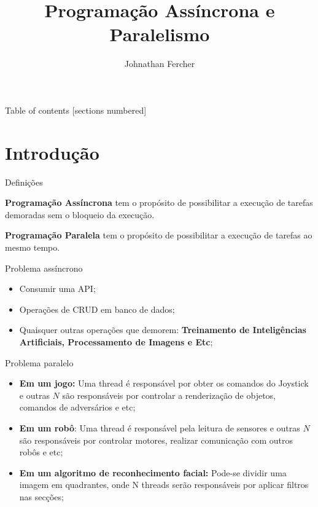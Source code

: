 \documentclass[10pt]{beamer}
\title{Programação Assíncrona e Paralelismo}
\author{Johnathan Fercher}
\begin{document}
\maketitle

\begin{frame}{Table of contents}
  [sections numbered]
  \tableofcontents[hideallsubsections]
\end{frame}

\section{Introdução}

\begin{frame}[fragile]{Definições}

  \textbf{Programação Assíncrona} tem o propósito de possibilitar a execução de tarefas demoradas sem o bloqueio da execução.

  \textbf{Programação Paralela} tem o propósito de possibilitar a execução de tarefas ao mesmo tempo.
  
\end{frame}
\begin{frame}[fragile]{Problema assíncrono}
	\begin{itemize}
		\item Consumir uma API;
		\item Operações de CRUD em banco de dados;
		\item Quaisquer outras operações que demorem: \textbf{Treinamento de Inteligências Artificiais, Processamento de Imagens e Etc};
	\end{itemize}
\end{frame}

\begin{frame}[fragile]{Problema paralelo}
	\begin{itemize}
		\item \textbf{Em um jogo:} Uma thread é responsável por obter os comandos do Joystick e outras $N$ são responsáveis por controlar a renderização de objetos, comandos de adversários e etc;
		\item \textbf{Em um robô}: Uma thread é responsável pela leitura de sensores e outras $N$ são responsáveis por controlar motores, realizar comunicação com outros robôs e etc;
		\item \textbf{Em um algoritmo de reconhecimento facial:} Pode-se dividir uma imagem em quadrantes, onde N threads serão responsáveis por aplicar filtros nas secções;
	\end{itemize}
\end{frame}
\end{document}
